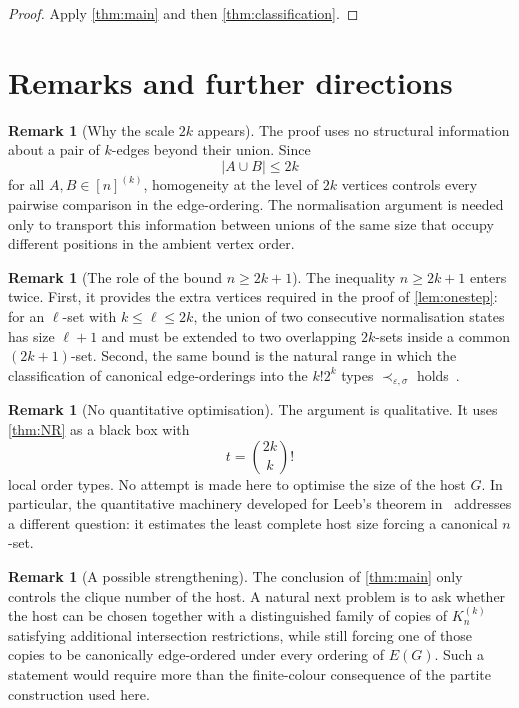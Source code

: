 \documentclass[11pt]{amsart}
\theoremstyle{definition}
\newtheorem{remark}[theorem]{Remark}
\newcommand{\eps}{\varepsilon}
\begin{document}
\begin{proof}
Apply \cref{thm:main} and then \cref{thm:classification}.
\end{proof}

\section{Remarks and further directions}

\begin{remark}[Why the scale $2k$ appears]
The proof uses no structural information about a pair of $k$-edges beyond their union. Since
\[
|A\cup B|\le2k
\]
for all $A,B\in[n]^{(k)}$, homogeneity at the level of $2k$ vertices controls every pairwise comparison in the edge-ordering. The normalisation argument is needed only to transport this information between unions of the same size that occupy different positions in the ambient vertex order.
\end{remark}

\begin{remark}[The role of the bound $n\ge2k+1$]
The inequality $n\ge2k+1$ enters twice. First, it provides the extra vertices required in the proof of \cref{lem:onestep}: for an $\ell$-set with $k\le\ell\le2k$, the union of two consecutive normalisation states has size $\ell+1$ and must be extended to two overlapping $2k$-sets inside a common $(2k+1)$-set. Second, the same bound is the natural range in which the classification of canonical edge-orderings into the $k!2^k$ types $\prec_{\eps,\sigma}$ holds~\cite{RRSSS2022}.
\end{remark}

\begin{remark}[No quantitative optimisation]
The argument is qualitative. It uses \cref{thm:NR} as a black box with
\[
t=\binom{2k}{k}!
\]
local order types. No attempt is made here to optimise the size of the host $G$. In particular, the quantitative machinery developed for Leeb's theorem in~\cite{RRSSS2022} addresses a different question: it estimates the least complete host size forcing a canonical $n$-set.
\end{remark}

\begin{remark}[A possible strengthening]
The conclusion of \cref{thm:main} only controls the clique number of the host. A natural next problem is to ask whether the host can be chosen together with a distinguished family of copies of $K_n^{(k)}$ satisfying additional intersection restrictions, while still forcing one of those copies to be canonically edge-ordered under every ordering of $E(G)$. Such a statement would require more than the finite-colour consequence of the partite construction used here.
\end{remark}
\end{document}
